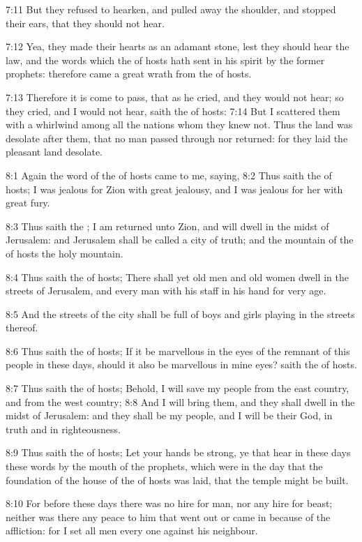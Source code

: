 7:11 But they refused to hearken, and pulled away the shoulder, and stopped their ears, that they should not hear.

7:12 Yea, they made their hearts as an adamant stone, lest they should hear the law, and the words which the \LORD of hosts hath sent in his spirit by the former prophets: therefore came a great wrath from the \LORD of hosts.

7:13 Therefore it is come to pass, that as he cried, and they would not hear; so they cried, and I would not hear, saith the \LORD of hosts: 7:14 But I scattered them with a whirlwind among all the nations whom they knew not. Thus the land was desolate after them, that no man passed through nor returned: for they laid the pleasant land desolate.

8:1 Again the word of the \LORD of hosts came to me, saying, 8:2 Thus saith the \LORD of hosts; I was jealous for Zion with great jealousy, and I was jealous for her with great fury.

8:3 Thus saith the \LORD; I am returned unto Zion, and will dwell in the midst of Jerusalem: and Jerusalem shall be called a city of truth; and the mountain of the \LORD of hosts the holy mountain.

8:4 Thus saith the \LORD of hosts; There shall yet old men and old women dwell in the streets of Jerusalem, and every man with his staff in his hand for very age.

8:5 And the streets of the city shall be full of boys and girls playing in the streets thereof.

8:6 Thus saith the \LORD of hosts; If it be marvellous in the eyes of the remnant of this people in these days, should it also be marvellous in mine eyes? saith the \LORD of hosts.

8:7 Thus saith the \LORD of hosts; Behold, I will save my people from the east country, and from the west country; 8:8 And I will bring them, and they shall dwell in the midst of Jerusalem: and they shall be my people, and I will be their God, in truth and in righteousness.

8:9 Thus saith the \LORD of hosts; Let your hands be strong, ye that hear in these days these words by the mouth of the prophets, which were in the day that the foundation of the house of the \LORD of hosts was laid, that the temple might be built.

8:10 For before these days there was no hire for man, nor any hire for beast; neither was there any peace to him that went out or came in because of the affliction: for I set all men every one against his neighbour.

